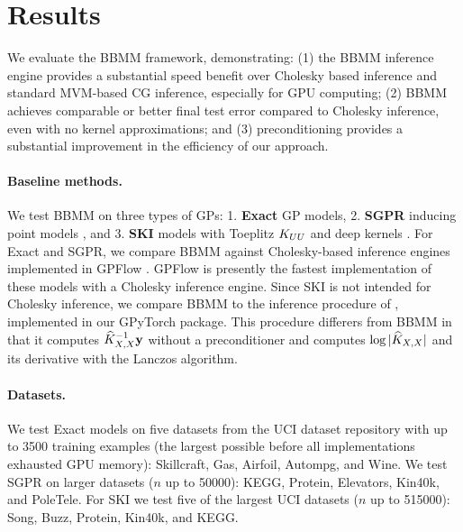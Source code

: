 \section{Results}

We evaluate the BBMM framework, demonstrating: (1) the BBMM inference engine provides a substantial speed benefit over Cholesky based inference and standard MVM-based CG inference, especially for GPU computing; (2) BBMM achieves comparable or better final test error compared to Cholesky inference, even with no kernel approximations; and (3) preconditioning provides a substantial improvement in the efficiency of our approach.

\paragraph{Baseline methods.} We test BBMM on three types of GPs:
1. {\bf Exact} GP models,
2. {\bf SGPR} inducing point models \cite{titsias2009variational,hensman2013gaussian},
and 3. {\bf SKI} models with Toeplitz $K_{UU}$ and deep kernels \cite{wilson2015kernel,wilson2016deep}.
For Exact and SGPR, we compare BBMM against Cholesky-based inference engines implemented in GPFlow \cite{matthews2017gpflow}.
GPFlow is presently the fastest implementation of these models with a Cholesky inference engine.
Since SKI is not intended for Cholesky inference, we compare BBMM to the inference procedure of \citet{dong2017scalable}, implemented in our GPyTorch package.
This procedure differers from BBMM in that it computes $\widehat{K}_{X,X}^{-1} \mathbf{y}$ without a preconditioner and computes $\log \vert \widehat{K}_{X,X} \vert$ and its derivative with the Lanczos algorithm.

\paragraph{Datasets.}
We test Exact models on five datasets from the UCI dataset repository \cite{asuncion2007uci} with up to 3500 training examples (the largest possible before all implementations exhausted GPU memory): Skillcraft, Gas, Airfoil, Autompg, and Wine.
We test SGPR on larger datasets ($n$ up to 50000): KEGG, Protein, Elevators, Kin40k, and PoleTele.
For SKI we test five of the largest UCI datasets ($n$ up to 515000): Song, Buzz, Protein, Kin40k, and KEGG.

